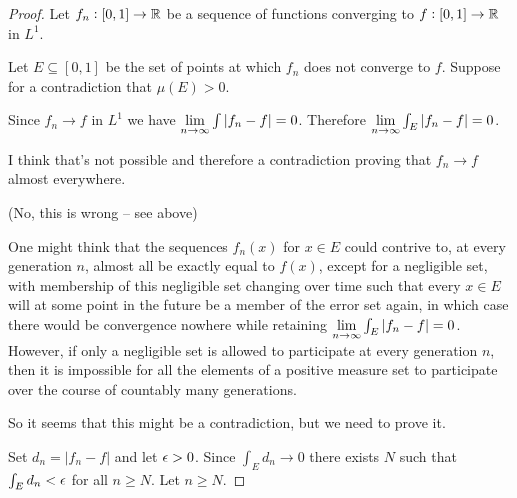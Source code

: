 \begin{proof}
  Let $f_n: [0, 1] \to \mathbb{R}$ be a sequence of functions converging to $f: [0, 1] \to \mathbb{R}$ in $L^1$.

  Let $E \subseteq [0, 1]$ be the set of points at which $f_n$ does not converge to $f$. Suppose for a
  contradiction that $\mu(E) > 0$.

  Since $f_n \to f$ in $L^1$ we have $\limninf \int |f_n - f| = 0$. Therefore $\limninf \int_E |f_n - f| = 0$.

  I think that's not possible and therefore a contradiction proving that $f_n \to f$ almost everywhere.

  (No, this is wrong -- see above)

  One might think that the sequences $f_n(x)$ for $x \in E$ could contrive to, at every generation $n$, almost
  all be exactly equal to $f(x)$, except for a negligible set, with membership of this negligible set changing
  over time such that every $x \in E$ will at some point in the future be a member of the error set again, in
  which case there would be convergence nowhere while retaining $\limninf \int_E |f_n - f| = 0$. However, if
  only a negligible set is allowed to participate at every generation $n$, then it is impossible for all the
  elements of a positive measure set to participate over the course of countably many generations.

  So it seems that this might be a contradiction, but we need to prove it.

  Set $d_n = |f_n - f|$ and let $\epsilon > 0$. Since $\int_E d_n \to 0$ there exists $N$ such
  that $\int_E d_n < \epsilon$ for all $n \geq N$. Let $n \geq N$.
\end{proof}



